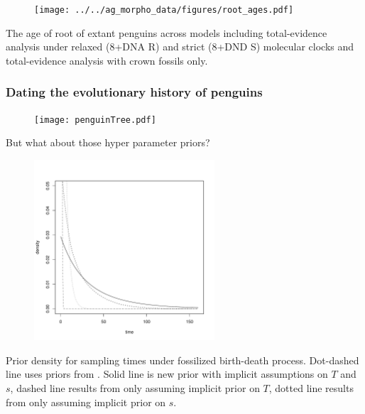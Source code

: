 
\begin{frame}
\begin{figure}
\begin{center}
\texttt{[image: ../../ag\_morpho\_data/figures/root\_ages.pdf]}
\label{fig:rootAges}
\end{center}
\end{figure}
\small{The age of root of extant penguins across models including total-evidence analysis under relaxed (8+DNA R) and strict (8+DND S) molecular clocks and 
total-evidence analysis with crown fossils only.}
\end{frame}


\begin{frame}
\frametitle{Dating the evolutionary history of penguins}
\begin{figure}
\texttt{[image: penguinTree.pdf]}
\end{figure}
\end{frame}



\begin{frame}{But what about those hyper parameter priors?}
\begin{figure}
\includegraphics[width=0.6\textwidth]{../priors.pdf}
\label{Fig:Prior}
\end{figure}

\small{Prior density for sampling times under fossilized birth-death process. Dot-dashed line uses priors from \textcite{gavryushkina2015bayesian}. 
Solid line is new prior with implicit assumptions on $T$ and $s$, dashed line results from only assuming implicit prior on $T$,  dotted line results from only assuming implicit prior on $s$.}
\end{frame}

